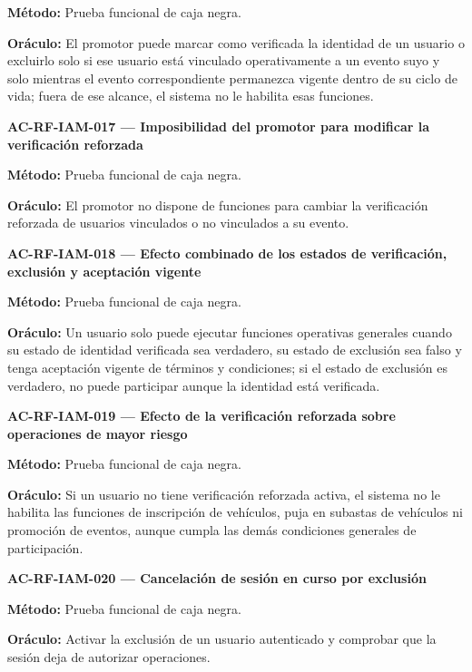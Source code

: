 \documentclass[10pt,letterpaper]{article}
\begin{document}
\textbf{Método:} Prueba funcional de caja negra.\par
\textbf{Oráculo:} El promotor puede marcar como verificada la identidad de un usuario o excluirlo solo si ese usuario está vinculado operativamente a un evento suyo y solo mientras el evento correspondiente permanezca vigente dentro de su ciclo de vida; fuera de ese alcance, el sistema no le habilita esas funciones.\par\vspace{0.45em}
\noindent\textbf{AC-RF-IAM-017 --- Imposibilidad del promotor para modificar la verificación reforzada}\par
\textbf{Método:} Prueba funcional de caja negra.\par
\textbf{Oráculo:} El promotor no dispone de funciones para cambiar la verificación reforzada de usuarios vinculados o no vinculados a su evento.\par\vspace{0.45em}
\noindent\textbf{AC-RF-IAM-018 --- Efecto combinado de los estados de verificación, exclusión y aceptación vigente}\par
\textbf{Método:} Prueba funcional de caja negra.\par
\textbf{Oráculo:} Un usuario solo puede ejecutar funciones operativas generales cuando su estado de identidad verificada sea verdadero, su estado de exclusión sea falso y tenga aceptación vigente de términos y condiciones; si el estado de exclusión es verdadero, no puede participar aunque la identidad está verificada.\par\vspace{0.45em}
\noindent\textbf{AC-RF-IAM-019 --- Efecto de la verificación reforzada sobre operaciones de mayor riesgo}\par
\textbf{Método:} Prueba funcional de caja negra.\par
\textbf{Oráculo:} Si un usuario no tiene verificación reforzada activa, el sistema no le habilita las funciones de inscripción de vehículos, puja en subastas de vehículos ni promoción de eventos, aunque cumpla las demás condiciones generales de participación.\par\vspace{0.45em}
\noindent\textbf{AC-RF-IAM-020 --- Cancelación de sesión en curso por exclusión}\par
\textbf{Método:} Prueba funcional de caja negra.\par
\textbf{Oráculo:} Activar la exclusión de un usuario autenticado y comprobar que la sesión deja de autorizar operaciones.\par\vspace{0.45em}
\end{document}
